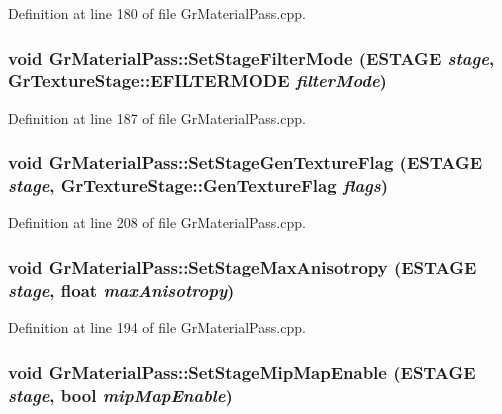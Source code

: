 Definition at line 180 of file GrMaterialPass.cpp.\hypertarget{class_gr_material_pass_e448ff2937e697a33893312e608efcaa}{
\subsubsection[{SetStageFilterMode}]{\setlength{\rightskip}{0pt plus 5cm}void GrMaterialPass::SetStageFilterMode ({\bf ESTAGE} {\em stage}, \/  {\bf GrTextureStage::EFILTERMODE} {\em filterMode})}}
\label{class_gr_material_pass_e448ff2937e697a33893312e608efcaa}




Definition at line 187 of file GrMaterialPass.cpp.\hypertarget{class_gr_material_pass_1817af9cfe2b22d4f2bd2f28d9b946e5}{
\subsubsection[{SetStageGenTextureFlag}]{\setlength{\rightskip}{0pt plus 5cm}void GrMaterialPass::SetStageGenTextureFlag ({\bf ESTAGE} {\em stage}, \/  {\bf GrTextureStage::GenTextureFlag} {\em flags})}}
\label{class_gr_material_pass_1817af9cfe2b22d4f2bd2f28d9b946e5}




Definition at line 208 of file GrMaterialPass.cpp.\hypertarget{class_gr_material_pass_af2bead7532c7701623f28c1522ec354}{
\subsubsection[{SetStageMaxAnisotropy}]{\setlength{\rightskip}{0pt plus 5cm}void GrMaterialPass::SetStageMaxAnisotropy ({\bf ESTAGE} {\em stage}, \/  float {\em maxAnisotropy})}}
\label{class_gr_material_pass_af2bead7532c7701623f28c1522ec354}




Definition at line 194 of file GrMaterialPass.cpp.\hypertarget{class_gr_material_pass_911ebc1580fe6a279045dd4274d491e3}{
\subsubsection[{SetStageMipMapEnable}]{\setlength{\rightskip}{0pt plus 5cm}void GrMaterialPass::SetStageMipMapEnable ({\bf ESTAGE} {\em stage}, \/  bool {\em mipMapEnable})}}
\label{class_gr_material_pass_911ebc1580fe6a279045dd4274d491e3}




